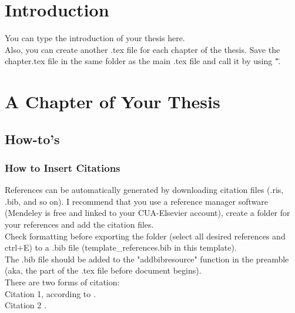 \documentclass[12pt]{report}
\begin{document}
	

\newpage
\pagestyle{myheadings}
\setcounter{page}{1}


\chapter{Introduction} \label{ch:intro}
\justify 
You can type the introduction of your thesis here. \\
Also, you can create another .tex file for each chapter of the thesis. Save the chapter.tex file in the same folder as the main .tex file and call it by using "\". \\

\chapter{A Chapter of Your Thesis}\label{ch:chapter_label}
\section{How-to's}
\subsection{How to Insert Citations}
References can be automatically generated by downloading citation files (.ris, .bib, and so on). I recommend that you use a reference manager software (Mendeley is free and linked to your CUA-Elsevier account), create a folder for your references and add the citation files. \\
Check formatting before exporting the folder (select all desired references and ctrl+E) to a .bib file (template\_references.bib in this template).\\
The .bib file should be added to the "addbibresource" function in the preamble (aka, the part of the .tex file before document begins). \\
There are two forms of citation: \\
Citation 1, according to \cite{Reference2}. \\
Citation 2 \autocite{Reference1}. 
\end{document}
